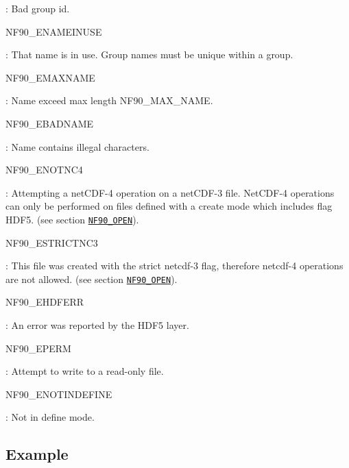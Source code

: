 \+: Bad group id.

{\ttfamily N\+F90\+\_\+\+E\+N\+A\+M\+E\+I\+N\+U\+SE}

\+: That name is in use. Group names must be unique within a group.

{\ttfamily N\+F90\+\_\+\+E\+M\+A\+X\+N\+A\+ME}

\+: Name exceed max length N\+F90\+\_\+\+M\+A\+X\+\_\+\+N\+A\+ME.

{\ttfamily N\+F90\+\_\+\+E\+B\+A\+D\+N\+A\+ME}

\+: Name contains illegal characters.

{\ttfamily N\+F90\+\_\+\+E\+N\+O\+T\+N\+C4}

\+: Attempting a net\+C\+D\+F-\/4 operation on a net\+C\+D\+F-\/3 file. Net\+C\+D\+F-\/4 operations can only be performed on files defined with a create mode which includes flag H\+D\+F5. (see section \href{#NF90_005fOPEN}{\tt N\+F90\+\_\+\+O\+P\+EN}).

{\ttfamily N\+F90\+\_\+\+E\+S\+T\+R\+I\+C\+T\+N\+C3}

\+: This file was created with the strict netcdf-\/3 flag, therefore netcdf-\/4 operations are not allowed. (see section \href{#NF90_005fOPEN}{\tt N\+F90\+\_\+\+O\+P\+EN}).

{\ttfamily N\+F90\+\_\+\+E\+H\+D\+F\+E\+RR}

\+: An error was reported by the H\+D\+F5 layer.

{\ttfamily N\+F90\+\_\+\+E\+P\+E\+RM}

\+: Attempt to write to a read-\/only file.

{\ttfamily N\+F90\+\_\+\+E\+N\+O\+T\+I\+N\+D\+E\+F\+I\+NE}

\+: Not in define mode.

\subsection*{Example}


